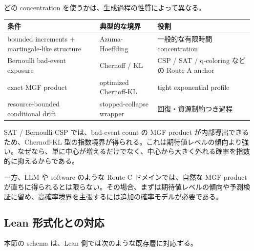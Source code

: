 \documentclass[12pt,a4paper]{article}
\begin{document}
どの concentration を使うかは、生成過程の性質によって異なる。

{\def\LTcaptype{table} %
\begin{longtable}[]{@{}
  >{\raggedright\arraybackslash}p{}
  >{\raggedright\arraybackslash}p{}
  >{\raggedright\arraybackslash}p{}@{}}
\toprule\noalign{}
\begin{minipage}[b]{\linewidth}\raggedright
条件
\end{minipage} & \begin{minipage}[b]{\linewidth}\raggedright
典型的な境界
\end{minipage} & \begin{minipage}[b]{\linewidth}\raggedright
役割
\end{minipage} \\
\midrule\noalign{}
\endhead
\bottomrule\noalign{}
\endlastfoot
bounded increments + martingale-like structure & Azuma-Hoeffding & 一般的な有限時間 concentration \\
Bernoulli bad-event exposure & Chernoff / KL & CSP / SAT / q-coloring などの Route A anchor \\
exact MGF product & optimized Chernoff-KL & tight exponential profile \\
resource-bounded conditional drift & stopped-collapse wrapper & 回復・資源制約つき過程 \\
\end{longtable}
}

SAT / Bernoulli-CSP では、bad-event count の MGF product が内部導出できるため、Chernoff-KL 型の指数境界が得られる。これは期待値レベルの傾向より強い。なぜなら、単に中心が増えるだけでなく、中心から大きく外れる確率を指数的に抑えるからである。

一方、LLM や software のような Route C ドメインでは、自然な MGF product が直ちに得られるとは限らない。その場合、まずは期待値レベルの傾向や予測検証に留め、高確率境界を主張するには追加の確率モデルが必要である。

\subsection{Lean 形式化との対応}\label{lean-ux5f62ux5f0fux5316ux3068ux306eux5bfeux5fdc-1}

本節の schema は、Lean 側では次のような既存層に対応する。
\end{document}
